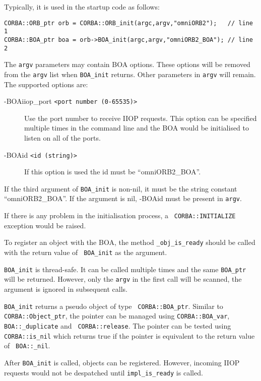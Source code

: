 \documentclass[11pt,twoside,onecolumn]{book}
\begin{document}
\noindent Typically, it is used in the startup code as follows:

{\small
\begin{verbatim}
CORBA::ORB_ptr orb = CORBA::ORB_init(argc,argv,"omniORB2");   // line 1
CORBA::BOA_ptr boa = orb->BOA_init(argc,argv,"omniORB2_BOA"); // line 2
\end{verbatim}
}

The {\tt argv} parameters may contain BOA options. These options will be
removed from the {\tt argv} list when {\tt BOA\_init} returns. Other
parameters in {\tt argv} will remain. The supported options are:

\begin{description}

\item[-BOAiiop\_port {\tt <port number (0-65535)>}] Use the port number to receive
IIOP requests. This option can be specified multiple times in the command
line and the BOA would be initialised to listen on all of the ports.

\item[-BOAid {\tt <id (string)>}] If this option is used the id must be
``omniORB2\_BOA''. 

\end{description}

If the third argument of {\tt BOA\_init} is non-nil, it must be the string
constant ``omniORB2\_BOA''. If the argument is nil, -BOAid must be present
in {\tt argv}.

If there is any problem in the initialisation process, a {\tt
CORBA::INITIALIZE} exception would be raised.

To register an object with the BOA, the method
{\tt \_obj\_is\_ready} should be called with the return value of {\tt
BOA\_init} as the argument.

{\tt BOA\_init} is thread-safe. It can be called multiple times and the
same {\tt BOA\_ptr} will be returned. However, only the {\tt argv} in the
first call will be scanned, the argument is ignored in subsequent calls.

{\tt BOA\_init} returns a pseudo object of type {\tt
CORBA::BOA\_ptr}. Similar to {\tt CORBA::Object\_ptr}, the pointer can be
managed using {\tt CORBA::BOA\_var}, {\tt BOA::\_duplicate} and {\tt
CORBA::release}. The pointer can be tested using {\tt CORBA::is\_nil} which
returns true if the pointer is equivalent to the return value of {\tt
BOA::\_nil}. 

After {\tt BOA\_init} is called, objects can be registered. However,
incoming IIOP requests would not be despatched until {\tt impl\_is\_ready}
is called.
\end{document}
